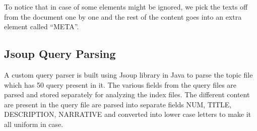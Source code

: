 To notice that in case of some elements might be ignored, we pick the texts off from the document one by one and the rest of the content goes into an extra element called \enquote{META}.

\subsection{Jsoup Query Parsing}

A custom query parser is built using Jsoup library in Java to parse the topic file which has 50 query present in it. The various fields from the query files are parsed and stored separately for analyzing the index files. The different content are present in the query file are parsed into separate fields NUM, TITLE, DESCRIPTION, NARRATIVE and converted into lower case letters to make it all uniform in case.
\vspace{0.2cm}


